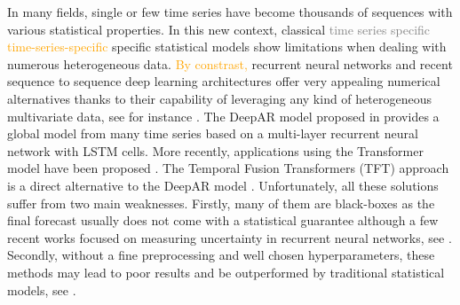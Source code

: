 \documentclass[10pt]{article} %
\begin{document}
In many fields, single or few time series have become thousands of sequences with various statistical properties. In this new context, classical \textcolor{gray}{time series specific} \textcolor{orange}{time-series-specific} specific statistical models show limitations when dealing with numerous heterogeneous data. \textcolor{orange}{By constrast,} recurrent neural networks and recent sequence to sequence deep learning architectures offer very appealing numerical alternatives thanks to their capability of leveraging any kind of heterogeneous multivariate data, see for instance \citet{ hochreiter1997,vaswani2017, siami2018, li2019, lim2019,salinas2020}. The DeepAR model proposed in \citet{salinas2020} provides a global model from many time series based on a multi-layer recurrent neural network with LSTM cells. More recently, applications using the Transformer model have been proposed  \citep{li2019}. The Temporal Fusion Transformers (TFT) approach is a direct alternative to the DeepAR model \citep{lim2019}.  Unfortunately, all these solutions suffer from two main weaknesses. Firstly, many of them are black-boxes  as the final forecast usually does not come with a statistical guarantee  although a few recent works focused on measuring uncertainty in recurrent neural networks, see  \citet{martin2020}. Secondly, without a fine preprocessing and well chosen hyperparameters, these methods may lead to poor results and be outperformed by traditional statistical models, see \citet{makridakis2018}.
\end{document}
